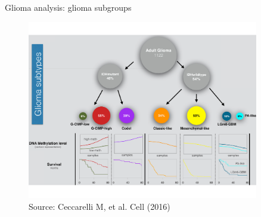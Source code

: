 \documentclass[slidestop,compress,11pt,xcolor=dvipsnames]{beamer}
\begin{document}
\begin{frame}{Glioma analysis: glioma subgroups}
\vspace{-0.5cm}
 \begin{figure}[ht!]
  \centering
  \includegraphics[width=0.9\textwidth]{glioma/figure1.pdf}{\tiny{\\Source: Ceccarelli M, et al. Cell (2016) }}
 \end{figure}
\end{frame}




\end{document}
